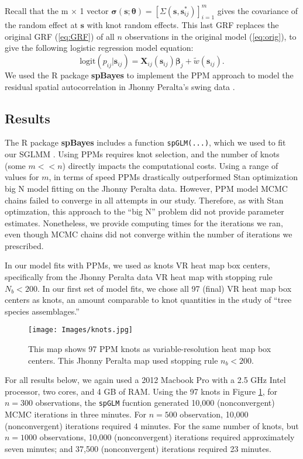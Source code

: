 Recall that the m $\times$ 1 vector $\pmb{\sigma}(\pmb{s};\pmb{\theta}) = \left[\Sigma(\pmb{s}, \pmb{s}_{ij}^{*})\right]_{i = 1}^{m}$ gives the covariance of the random effect at $\pmb{s}$ with knot random effects. This last GRF replaces the original GRF (\ref{eq:GRF}) of all $n$ observations in the original model (\ref{eq:orig}), to give the following logistic regression model equation:
\begin{equation}
\text{logit}(p_{ij}|\pmb{s}_{ij}) = \pmb{X}_{ij}(\pmb{s}_{ij}) \pmb{\beta}_{j} + \tilde{w}(\pmb{s}_{ij}).
\end{equation}
We used the R package {\bf spBayes} to implement the PPM approach to model the residual spatial autocorrelation in Jhonny Peralta's swing data \citep{Finley2013}. 

\subsection{Results} \label{PPMresults}

The R package {\bf spBayes} includes a function \verb|spGLM(...)|, which we used to fit our SGLMM \citep{Finley2013}. Using PPMs requires knot selection, and the number of knots (some $m < < n$) directly impacts the computational costs. Using a range of values for $m$, in terms of speed PPMs drastically outperformed Stan optimization big N model fitting on the Jhonny Peralta data. However, PPM model MCMC chains failed to converge in all attempts in our study. Therefore, as with Stan optimzation, this approach to the ``big N'' problem did not provide parameter estimates. Nonetheless, we provide computing times for the iterations we ran, even though MCMC chains did not converge within the number of iterations we prescribed.

In our model fits with PPMs, we used as knots VR heat map box centers, specifically from the Jhonny Peralta data VR heat map with stopping rule $N_{b} < 200$. In our first set of model fits, we chose all 97 (final) VR heat map box centers as knots, an amount comparable to knot quantities in the \cite{Finley2009_2} study of ``tree species assemblages.'' 
  \begin{figure}[H]
	\centering 
	\texttt{[image: Images/knots.jpg]}
	\caption{This map shows 97 PPM knots as variable-resolution heat map box centers. This Jhonny Peralta map used stopping rule $n_{b} < 200$.}
	\label{fig:knots}
	\end{figure}
For all results below, we again used a 2012 Macbook Pro with a 2.5 GHz Intel processor, two cores, and 4 GB of RAM. Using the 97 knots in Figure \ref{fig:knots}, for $n = 300$ observations, the \verb|spGLM| fucntion generated 10,000 (nonconvergent) MCMC iterations in three minutes. For $n = 500$ observation, 10,000 (nonconvergent) iterations required 4 minutes. For the same number of knots, but $n = 1000$ observations, 10,000 (nonconvergent) iterations required approximately seven minutes; and 37,500 (nonconvergent) iterations required 23 minutes. 

